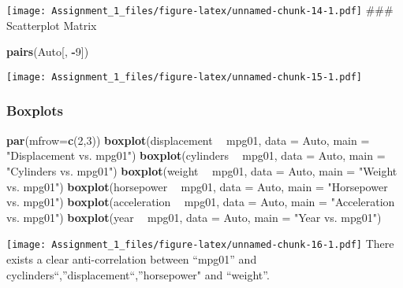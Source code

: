 \documentclass[]{article}
\newenvironment{Shaded}{\begin{snugshade}}{\end{snugshade}}
\newcommand{\KeywordTok}[1]{\textcolor[rgb]{0.13,0.29,0.53}{\textbf{#1}}}
\newcommand{\DataTypeTok}[1]{\textcolor[rgb]{0.13,0.29,0.53}{#1}}
\newcommand{\DecValTok}[1]{\textcolor[rgb]{0.00,0.00,0.81}{#1}}
\newcommand{\StringTok}[1]{\textcolor[rgb]{0.31,0.60,0.02}{#1}}
\newcommand{\OperatorTok}[1]{\textcolor[rgb]{0.81,0.36,0.00}{\textbf{#1}}}
\newcommand{\NormalTok}[1]{#1}
\begin{document}
\texttt{[image: Assignment\_1\_files/figure-latex/unnamed-chunk-14-1.pdf]}
\#\#\# Scatterplot Matrix

\begin{Shaded}
\begin{Highlighting}[]
\KeywordTok{pairs}\NormalTok{(Auto[, }\OperatorTok{-}\DecValTok{9}\NormalTok{])}
\end{Highlighting}
\end{Shaded}

\texttt{[image: Assignment\_1\_files/figure-latex/unnamed-chunk-15-1.pdf]}

\subsubsection{Boxplots}\label{boxplots}

\begin{Shaded}
\begin{Highlighting}[]
\KeywordTok{par}\NormalTok{(}\DataTypeTok{mfrow=}\KeywordTok{c}\NormalTok{(}\DecValTok{2}\NormalTok{,}\DecValTok{3}\NormalTok{))}
\KeywordTok{boxplot}\NormalTok{(displacement }\OperatorTok{~}\StringTok{ }\NormalTok{mpg01, }\DataTypeTok{data =}\NormalTok{ Auto, }\DataTypeTok{main =} \StringTok{"Displacement vs. mpg01"}\NormalTok{)}
\KeywordTok{boxplot}\NormalTok{(cylinders }\OperatorTok{~}\StringTok{ }\NormalTok{mpg01, }\DataTypeTok{data =}\NormalTok{ Auto, }\DataTypeTok{main =} \StringTok{"Cylinders vs. mpg01"}\NormalTok{)}
\KeywordTok{boxplot}\NormalTok{(weight }\OperatorTok{~}\StringTok{ }\NormalTok{mpg01, }\DataTypeTok{data =}\NormalTok{ Auto, }\DataTypeTok{main =} \StringTok{"Weight vs. mpg01"}\NormalTok{)}
\KeywordTok{boxplot}\NormalTok{(horsepower }\OperatorTok{~}\StringTok{ }\NormalTok{mpg01, }\DataTypeTok{data =}\NormalTok{ Auto, }\DataTypeTok{main =} \StringTok{"Horsepower vs. mpg01"}\NormalTok{)}
\KeywordTok{boxplot}\NormalTok{(acceleration }\OperatorTok{~}\StringTok{ }\NormalTok{mpg01, }\DataTypeTok{data =}\NormalTok{ Auto, }\DataTypeTok{main =} \StringTok{"Acceleration vs. mpg01"}\NormalTok{)}
\KeywordTok{boxplot}\NormalTok{(year }\OperatorTok{~}\StringTok{ }\NormalTok{mpg01, }\DataTypeTok{data =}\NormalTok{ Auto, }\DataTypeTok{main =} \StringTok{"Year vs. mpg01"}\NormalTok{)}
\end{Highlighting}
\end{Shaded}

\texttt{[image: Assignment\_1\_files/figure-latex/unnamed-chunk-16-1.pdf]}
There exists a clear anti-correlation between ``mpg01'' and
cyclinders``,''displacement``,''horsepower" and ``weight''.
\end{document}
